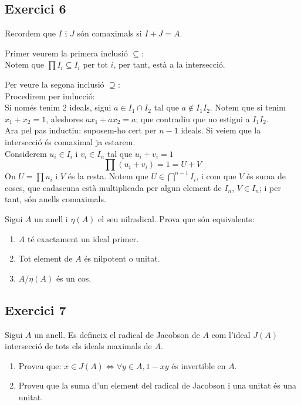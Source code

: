 \documentclass[11pt, a4paper]{article}
\begin{document}
\subsection{Exercici 6}
Recordem que $I$ i $J$ són comaximals si $I+J=A$.\par
Primer veurem la primera inclusió $\subseteq$:\\
Notem que $\prod I_i\subseteq I_i$ per tot $i$, per tant, està a la intersecció.\par
Per veure la segona inclusió $\supseteq$:\\
Procedirem per inducció:\\
Si només tenim 2 ideals, sigui $a\in I_1\cap I_2$ tal que $a\notin I_1 I_2$. Notem que si tenim $x_1+x_2=1$, aleshores $ax_1+ax_2=a$; que contradiu que no estigui a $I_1I_2$.\\
Ara pel pas inductiu: suposem-ho cert per $n-1$ ideals. Si veiem que la intersecció és comaximal ja estarem.\\
Considerem $u_i\in I_i$ i $v_i\in I_n$ tal que $u_i+v_i=1$
\[
\prod (u_i+v_i)=1=U+V
\]
On $U=\prod u_i$ i $V$ és la resta. Notem que $U\in\bigcap^{n-1} I_i$, i com que $V$ és suma de coses, que cadascuna està multiplicada per algun element de $I_n$, $V\in I_n$; i per tant, són anells comaximals.
\newpage
\begin{tcolorbox}[title=\section{Exercici 7}]
Sigui $A$ un anell i $\eta(A)$ el seu nilradical. Prova que són equivalents:
\begin{enumerate}
    \item $A$ té exactament un ideal primer.
    \item Tot element de $A$ és nilpotent o unitat.
    \item $A/\eta(A)$ és un cos.
\end{enumerate}
\end{tcolorbox}
\subsection{Exercici 7}


\newpage
\begin{tcolorbox}[title=\section{Exercici 8}]
Sigui $A$ un anell. Es defineix el radical de Jacobson de $A$ com l'ideal $J(A)$ intersecció de tots els ideals maximals de $A$.
\begin{enumerate}
    \item Proveu que: $x \in J(A) \iff \forall y \in A, 1 - xy$ és invertible en $A$.
    \item Proveu que la suma d'un element del radical de Jacobson i una unitat és una unitat.
\end{enumerate}
\end{tcolorbox}
\end{document}
